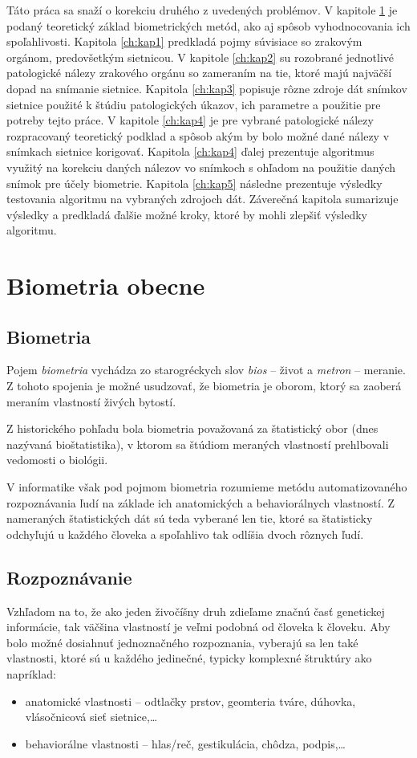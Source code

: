 Táto práca sa snaží o korekciu druhého z uvedených problémov. V kapitole \ref{ch:kap0} je podaný teoretický základ biometrických metód, ako aj spôsob vyhodnocovania ich spoľahlivosti. Kapitola \ref{ch:kap1} predkladá pojmy súvisiace so zrakovým orgánom, predovšetkým sietnicou. V kapitole \ref{ch:kap2} su rozobrané jednotlivé patologické nálezy zrakového orgánu so zameraním na tie, ktoré majú najväčší dopad na snímanie sietnice. Kapitola \ref{ch:kap3} popisuje rôzne zdroje dát snímkov sietnice použité k štúdiu patologických úkazov, ich parametre a použitie pre potreby tejto práce. V kapitole \ref{ch:kap4} je pre vybrané patologické nálezy rozpracovaný teoretický podklad a spôsob akým by bolo možné dané nálezy v snímkach sietnice korigovať. Kapitola \ref{ch:kap4} ďalej prezentuje algoritmus využitý na korekciu daných nálezov vo snímkoch s ohľadom na použitie daných snímok pre účely biometrie. Kapitola \ref{ch:kap5} následne prezentuje výsledky testovania algoritmu na vybraných zdrojoch dát. Záverečná kapitola sumarizuje výsledky a predkladá ďalšie možné kroky, ktoré by mohli zlepšiť výsledky algoritmu.

\chapter{Biometria obecne}\label{ch:kap0}
\section{Biometria}
Pojem \emph{biometria} vychádza zo starogréckych slov \emph{bios} -- život a \emph{metron} -- meranie. Z tohoto spojenia je možné usudzovať, že biometria je oborom, ktorý sa zaoberá meraním vlastností živých bytostí.

Z historického pohľadu bola biometria považovaná za štatistický obor (dnes nazývaná bioštatistika), v ktorom sa štúdiom meraných vlastností prehlbovali vedomosti o biológii\cite{hist}.

V informatike však pod pojmom biometria rozumieme metódu automatizovaného rozpoznávania ľudí na základe ich anatomických a behaviorálnych vlastností\cite{bio}.
Z nameraných štatistických dát sú teda vyberané len tie, ktoré sa štatisticky odchyľujú u každého človeka a spoľahlivo tak odlíšia dvoch rôznych ľudí.

\section{Rozpoznávanie}
Vzhľadom na to, že ako jeden živočíšny druh zdieľame značnú časť genetickej informácie, tak väčšina vlastností je veľmi podobná od človeka k človeku. Aby bolo možné dosiahnuť jednoznačného rozpoznania, vyberajú sa len také vlastnosti, ktoré sú u každého jedinečné, typicky komplexné štruktúry ako napríklad:
\begin{itemize}
\item anatomické vlastnosti -- odtlačky prstov, geomteria tváre, dúhovka, vlásočnicová sieť sietnice,\dots
\item behaviorálne vlastnosti -- hlas/reč, gestikulácia, chôdza, podpis,\dots
\end{itemize}

